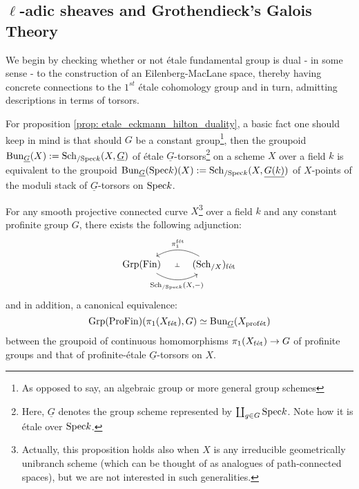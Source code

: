    \subsection{\texorpdfstring{$\ell$}{}-adic sheaves and Grothendieck's Galois Theory}
        We begin by checking whether or not \'etale fundamental group is dual - in some sense - to the construction of an Eilenberg-MacLane space, thereby having concrete connections to the $1^{st}$ \'etale cohomology group and in turn, admitting descriptions in terms of torsors.
        \begin{remark}
            For proposition \ref{prop: etale_eckmann_hilton_duality}, a basic fact one should keep in mind is that should $G$ be a constant group\footnote{As opposed to say, an algebraic group or more general group schemes}, then the groupoid $\mathrm{Bun}_{\underline{G}}(X) := \mathrm{Sch}_{/\mathrm{Spec} k}(X, \underline{G})$ of \'etale $\underline{G}$-torsors\footnote{Here, $\underline{G}$ denotes the group scheme represented by $\coprod_{g \in G} \mathrm{Spec} k$. Note how it is \'etale over $\mathrm{Spec} k$.} on a scheme $X$ over a field $k$ is equivalent to the groupoid $\mathrm{Bun}_{\underline{G}}(\mathrm{Spec} k)(X) := \mathrm{Sch}_{/\mathrm{Spec} k}(X, \underline{G(k)})$ of $X$-points of the moduli stack of $\underline{G}$-torsors on $\mathrm{Spec} k$.
        \end{remark}
        \begin{proposition} \label{prop: etale_eckmann_hilton_duality}
            For any smooth projective connected curve $X$\footnote{Actually, this proposition holds also when $X$ is any irreducible geometrically unibranch scheme (which can be thought of as analogues of path-connected spaces), but we are not interested in such generalities.} over a field $k$ and any constant profinite group $G$, there exists the following adjunction:
                $$
                    \begin{tikzcd}
                    	{\Grp(\Fin)} & {(\Sch_{/X})_{\fet}}
                    	\arrow[""{name=0, anchor=center, inner sep=0}, "{\Sch_{/\Spec k}(X, -)}"', bend right, from=1-1, to=1-2]
                    	\arrow[""{name=1, anchor=center, inner sep=0}, "{\pi_1^{\fet}}"', bend right, from=1-2, to=1-1]
                    	\arrow["\dashv"{anchor=center, rotate=-90}, draw=none, from=1, to=0]
                    \end{tikzcd}
                $$
            and in addition, a canonical equivalence:
                $$\mathrm{Grp}(\mathrm{Pro}\mathrm{Fin})(\pi_1(X_{\mathrm{f\acute{e}t}}), G) \simeq \mathrm{Bun}_{\underline{G}}(X_{\mathrm{prof\acute{e}t}})$$
            between the groupoid of continuous homomorphisms $\pi_1(X_{\mathrm{f\acute{e}t}}) \to G$ of profinite groups and that of profinite-\'etale $\underline{G}$-torsors on $X$.
        \end{proposition}
